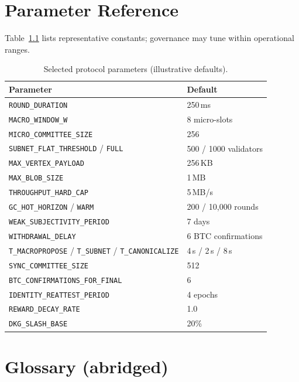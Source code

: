 \documentclass[11pt,a4paper,twoside]{report}
\theoremstyle{definition}
\begin{document}
\chapter{Parameter Reference}
Table~\ref{tab:params} lists representative constants; governance may tune within operational ranges.

\begin{table}[htbp]
  \centering
  \caption{Selected protocol parameters (illustrative defaults).}
  \label{tab:params}
  \small
  \begin{tabular}{@{}l l@{}}
    \toprule
    \textbf{Parameter} & \textbf{Default} \\
    \midrule
    \texttt{ROUND\_DURATION} & 250\,ms \\
    \texttt{MACRO\_WINDOW\_W} & 8 micro-slots \\
    \texttt{MICRO\_COMMITTEE\_SIZE} & 256 \\
    \texttt{SUBNET\_FLAT\_THRESHOLD} / \texttt{FULL} & 500 / 1000 validators \\
    \texttt{MAX\_VERTEX\_PAYLOAD} & 256\,KB \\
    \texttt{MAX\_BLOB\_SIZE} & 1\,MB \\
    \texttt{THROUGHPUT\_HARD\_CAP} & 5\,MB/s \\
    \texttt{GC\_HOT\_HORIZON} / \texttt{WARM} & 200 / 10{,}000 rounds \\
    \texttt{WEAK\_SUBJECTIVITY\_PERIOD} & 7 days \\
    \texttt{WITHDRAWAL\_DELAY} & 6 BTC confirmations \\
    \texttt{T\_MACROPROPOSE} / \texttt{T\_SUBNET} / \texttt{T\_CANONICALIZE} & 4\,s / 2\,s / 8\,s \\
    \texttt{SYNC\_COMMITTEE\_SIZE} & 512 \\
    \texttt{BTC\_CONFIRMATIONS\_FOR\_FINAL} & 6 \\
    \texttt{IDENTITY\_REATTEST\_PERIOD} & 4 epochs \\
    \texttt{REWARD\_DECAY\_RATE} & 1.0 \\
    \texttt{DKG\_SLASH\_BASE} & 20\% \\
    \bottomrule
  \end{tabular}
\end{table}

\chapter*{Glossary (abridged)}
\end{document}

